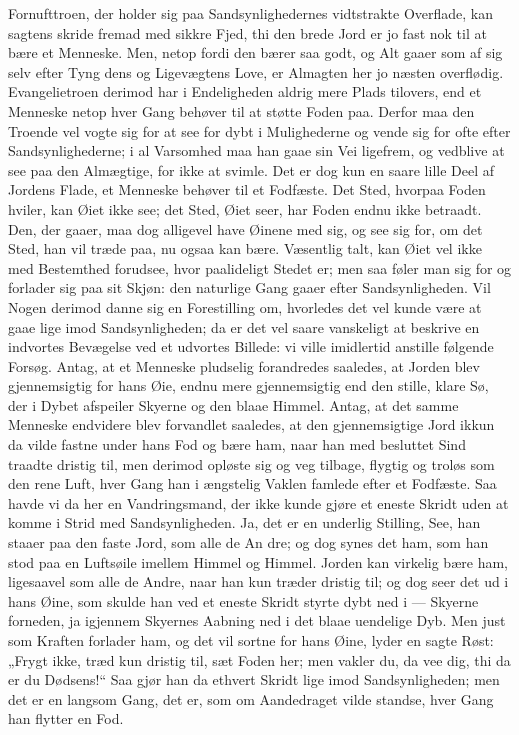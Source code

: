 \documentclass[12pt,a4paper]{book}
\begin{document}
Fornufttroen, der holder sig paa Sandsynlighedernes vidtstrakte
Overflade, kan sagtens skride fremad med sikkre Fjed, thi den brede Jord
er jo fast nok til at bære et Menneske. Men, netop fordi den bærer saa
godt, og Alt gaaer som af sig selv efter Tyng\-%
dens og Ligevægtens Love, er Almagten her jo næsten overflødig.
Evangelietroen derimod har i Endeligheden aldrig mere Plads tilovers, end
et Menneske netop hver Gang behøver til at støtte Foden paa. Derfor maa
den Troende vel vogte sig for at see for dybt i Mulighederne og vende sig
for ofte efter Sandsynlighederne; i al Varsomhed maa han gaae sin Vei
ligefrem, og vedblive at see paa den Almægtige, for ikke at svimle. Det
er dog kun en saare lille Deel af Jordens Flade, et Menneske behøver til
et Fodfæste. Det Sted, hvorpaa Foden hviler, kan Øiet ikke see; det Sted,
Øiet seer, har Foden endnu ikke betraadt. Den, der gaaer, maa dog
alligevel have Øinene med sig, og see sig for, om det Sted, han vil træde
paa, nu ogsaa kan bære. Væsentlig talt, kan Øiet vel ikke med Bestemthed
forudsee, hvor paalideligt Stedet er; men saa føler man sig for og
forlader sig paa sit Skjøn: den naturlige Gang gaaer efter
Sandsynligheden. Vil Nogen derimod danne sig en Forestilling om,
hvorledes det vel kunde være at gaae lige imod Sandsynligheden; da er det
vel saare vanskeligt at beskrive en indvortes Bevægelse ved et udvortes
Billede: vi ville imidlertid anstille følgende Forsøg. Antag, at et
Menneske pludselig forandredes saaledes, at Jorden blev gjennemsigtig for
hans Øie, endnu mere gjennemsigtig end den stille, klare Sø, der i Dybet
afspeiler Skyerne og den blaae Himmel. Antag, at det samme Menneske
endvidere blev forvandlet saaledes, at den gjennemsigtige Jord ikkun da
vilde fastne under hans Fod og bære ham, naar han med besluttet Sind
traadte dristig til, men derimod opløste sig og veg tilbage, flygtig og
troløs som den rene Luft, hver Gang han i ængstelig Vaklen famlede efter
et Fodfæste. Saa havde vi da her en Vandringsmand, der ikke kunde gjøre
et eneste Skridt uden at komme i Strid med Sandsynligheden. Ja, det er en
underlig Stilling, See, han staaer paa den faste Jord, som alle de An\-%
dre; og dog synes det ham, som han stod paa en Luftsøile imellem Himmel
og Himmel. Jorden kan virkelig bære ham, ligesaavel som alle de Andre,
naar han kun træder dristig til; og dog seer det ud i hans Øine, som
skulde han ved et eneste Skridt styrte dybt ned i --- Skyerne forneden,
ja igjennem Skyernes Aabning ned i det blaae uendelige Dyb. Men just som
Kraften forlader ham, og det vil sortne for hans Øine, lyder en sagte
Røst: „Frygt ikke, træd kun dristig til, sæt Foden her; men vakler du, da
vee dig, thi da er du Dødsens!“ Saa gjør han da ethvert Skridt lige imod
Sandsynligheden; men det er en langsom Gang, det er, som om Aandedraget
vilde standse, hver Gang han flytter en Fod.
\end{document}
